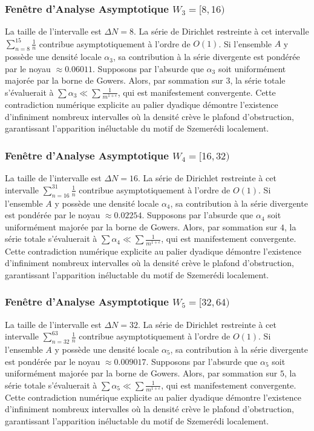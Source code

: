 \documentclass[11pt,a4paper]{article}
\begin{document}
\subsubsection{Fenêtre d'Analyse Asymptotique $W_{3} = [8, 16)$}
La taille de l'intervalle est $\Delta N = 8$. La série de Dirichlet restreinte à cet intervalle $\sum_{n=8}^{15} \frac{1}{n}$ contribue asymptotiquement à l'ordre de $O(1)$. Si l'ensemble $A$ y possède une densité locale $\alpha_{3}$, sa contribution à la série divergente est pondérée par le noyau $\approx 0.06011$. Supposons par l'absurde que $\alpha_{3}$ soit uniformément majorée par la borne de Gowers. Alors, par sommation sur $3$, la série totale s'évaluerait à $\sum \alpha_{3} \ll \sum \frac{1}{m^{1+\epsilon}}$, qui est manifestement convergente. Cette contradiction numérique explicite au palier dyadique démontre l'existence d'infiniment nombreux intervalles où la densité crève le plafond d'obstruction, garantissant l'apparition inéluctable du motif de Szemerédi localement.
\subsubsection{Fenêtre d'Analyse Asymptotique $W_{4} = [16, 32)$}
La taille de l'intervalle est $\Delta N = 16$. La série de Dirichlet restreinte à cet intervalle $\sum_{n=16}^{31} \frac{1}{n}$ contribue asymptotiquement à l'ordre de $O(1)$. Si l'ensemble $A$ y possède une densité locale $\alpha_{4}$, sa contribution à la série divergente est pondérée par le noyau $\approx 0.02254$. Supposons par l'absurde que $\alpha_{4}$ soit uniformément majorée par la borne de Gowers. Alors, par sommation sur $4$, la série totale s'évaluerait à $\sum \alpha_{4} \ll \sum \frac{1}{m^{1+\epsilon}}$, qui est manifestement convergente. Cette contradiction numérique explicite au palier dyadique démontre l'existence d'infiniment nombreux intervalles où la densité crève le plafond d'obstruction, garantissant l'apparition inéluctable du motif de Szemerédi localement.
\subsubsection{Fenêtre d'Analyse Asymptotique $W_{5} = [32, 64)$}
La taille de l'intervalle est $\Delta N = 32$. La série de Dirichlet restreinte à cet intervalle $\sum_{n=32}^{63} \frac{1}{n}$ contribue asymptotiquement à l'ordre de $O(1)$. Si l'ensemble $A$ y possède une densité locale $\alpha_{5}$, sa contribution à la série divergente est pondérée par le noyau $\approx 0.009017$. Supposons par l'absurde que $\alpha_{5}$ soit uniformément majorée par la borne de Gowers. Alors, par sommation sur $5$, la série totale s'évaluerait à $\sum \alpha_{5} \ll \sum \frac{1}{m^{1+\epsilon}}$, qui est manifestement convergente. Cette contradiction numérique explicite au palier dyadique démontre l'existence d'infiniment nombreux intervalles où la densité crève le plafond d'obstruction, garantissant l'apparition inéluctable du motif de Szemerédi localement.
\end{document}
